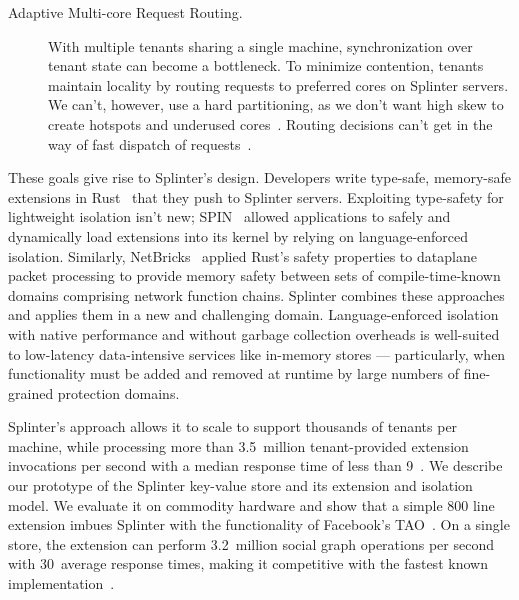 \begin{description}
\item[Adaptive Multi-core Request Routing.]
  With multiple tenants sharing a single machine, synchronization over tenant
    state can become a bottleneck.
  To minimize contention, tenants maintain locality by routing requests to
    preferred cores on Splinter servers.
  We can't, however, use a hard partitioning, as we don't want high skew to
    create hotspots and underused cores~\cite{zygos}.
    Routing decisions can't get in the way of fast dispatch of requests~\cite{ix}.

\end{description}

These goals give rise to Splinter's design.
Developers write type-safe, memory-safe extensions in Rust~\cite{rust-2018}
that they push to Splinter servers.
Exploiting type-safety for lightweight isolation isn't new;
SPIN~\cite{spin} allowed applications to safely and dynamically load
extensions into its kernel by relying on language-enforced isolation.
Similarly, NetBricks~\cite{netbricks-2016} applied Rust's safety
properties to dataplane packet processing to
  provide memory safety between sets of compile-time-known domains comprising
  network function chains.
Splinter combines these approaches and applies them in a new and challenging domain.
Language-enforced isolation with native performance and without garbage
  collection overheads is well-suited to low-latency data-intensive services
  like in-memory stores --- particularly, when functionality must be added and removed at
  runtime by large numbers of fine-grained protection domains.

Splinter's approach allows it to scale to support thousands of tenants per
  machine, while processing more than
  3.5~million tenant-provided extension invocations per second with a median
  response time of less than 9~\us.
We describe our prototype of the Splinter key-value store and its
  extension and isolation model.
We evaluate it on commodity hardware and show that a simple 800
  line extension imbues Splinter with the functionality of Facebook's
  TAO~\cite{tao-2013}.
On a single store, the extension can perform 3.2~million social graph
  operations per second with 30~\us average response times, making it
  competitive with the fastest known implementation~\cite{farm-2014}.

